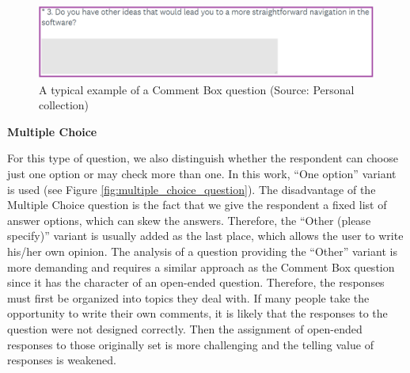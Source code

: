 \documentclass[a4paper,10pt,twoside]{article}
\begin{document}
\vspace{0.3cm}
\begin{figure}[hbt!] 
\begin{center}
\includegraphics[width=15cm]{../pictures/comment_box_question.png} 
\caption[A typical example of a Comment Box question]{A typical example of a Comment Box question (Source: Personal collection)}
\label{fig:comment_box_question}
\end{center}
\end{figure}

\newpage
\vspace*{-1cm}
\bigskip
\noindent \textbf {Multiple Choice}

\noindent For this type of question, we also distinguish whether the
respondent can choose just one option or may check more than one. In
this work, ``One option'' variant is used (see Figure
\ref{fig:multiple_choice_question}). The disadvantage of the Multiple
Choice question is the fact that we give the respondent a fixed list
of answer options, which can skew the answers. Therefore, the ``Other
(please specify)'' variant is usually added as the last place, which
allows the user to write his/her own opinion. The analysis of a question
providing the ``Other'' variant is more demanding and requires a
similar approach as the Comment Box question since it has the
character of an open-ended question. Therefore, the responses must
first be organized into topics they deal with. If many people take the
opportunity to write their own comments, it is likely that the
responses to the question were not designed correctly. Then the
assignment of open-ended responses to those originally set is more
challenging and the telling value of responses is weakened.
\end{document}
